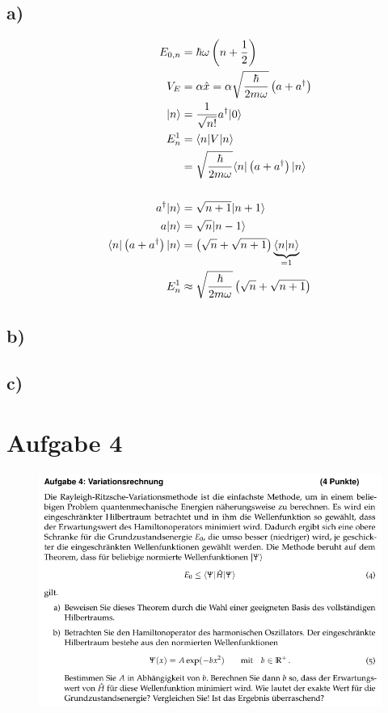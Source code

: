 \subsection{a)}

    \begin{align*}
        E_{0,n} &= \hbar\omega \left( n+\frac{1}{2} \right)\\
        V_E &= \alpha \hat{x} = \alpha \sqrt{\frac{\hbar}{2m\omega}} \left( a+a^{\dagger} \right)\\
        \lvert n\rangle &= \frac{1}{\sqrt{n!}} a^{\dagger} \lvert0\rangle\\
        E_n^1 &= \langle n\rvert V\lvert n\rangle\\
        &= \sqrt{\frac{\hbar}{2m\omega}} \langle n\rvert \left( a+a^{\dagger} \right) \lvert n\rangle \\
        \\
        a^{\dagger} \lvert n\rangle &= \sqrt{n+1} \lvert n+1\rangle\\
        a \lvert n\rangle &= \sqrt{n} \lvert n-1\rangle\\
        \langle n\rvert \left( a+a^{\dagger} \right) \lvert n\rangle &= \left( \sqrt{n} + \sqrt{n+1} \right) \underbrace{\braket{n}{n}}_{=1}\\
        E_n^1 &\approx \sqrt{\frac{\hbar}{2m\omega}} \left( \sqrt{n} + \sqrt{n+1} \right)
    \end{align*}

\subsection{b)}


\subsection{c)}

\section{Aufgabe 4}

    \begin{figure}[H]
        \centering
        \includegraphics[width=\textwidth]{images/Aufgabe4a.jpg}
        \label{fig:5}
    \end{figure}

